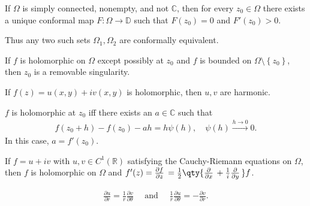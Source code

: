 \begin{theorem}

If \(\Omega\) is simply connected, nonempty, and not \({\mathbb{C}}\),
then for every \(z_{0}\in \Omega\) there exists a unique conformal map
\(F:\Omega \to {\mathbb{D}}\) such that \(F(z_{0}) = 0\) and
\(F'(z_{0}) > 0\).

Thus any two such sets \(\Omega_{1}, \Omega_{2}\) are conformally
equivalent.

\end{theorem}

\begin{theorem}

If \(f\) is holomorphic on \(\Omega\) except possibly at \(z_0\) and
\(f\) is bounded on \(\Omega\setminus\left\{{z_0}\right\}\), then
\(z_0\) is a removable singularity.

\end{theorem}

\begin{proposition}

If \(f(z) = u(x, y) + iv(x, y)\) is holomorphic, then \(u, v\) are
harmonic.

\end{proposition}

\begin{proposition}

\(f\) is holomorphic at \(z_0\) iff there exists an
\(a\in {\mathbb{C}}\) such that
\begin{align*}  
f(z_0 + h) - f(z_0) - ah = h \psi(h), \quad \psi(h) \overset{h\to 0}\to 0
.\end{align*}
In this case, \(a = f'(z_0)\).

\end{proposition}

\begin{proposition}

If \(f = u+iv\) with \(u, v\in C^1({\mathbb{R}})\) satisfying the
Cauchy-Riemann equations on \(\Omega\), then \(f\) is holomorphic on
\(\Omega\) and
\(f'(z) = {\frac{\partial f}{\partial z}\,} = {1 \over 2} \qty{{\frac{\partial }{\partial x}\,} + {1\over i} {\frac{\partial }{\partial y}\,}}f\).

\end{proposition}

\begin{proposition}

\begin{align*}  
\frac{\partial u}{\partial r}=\frac{1}{r} \frac{\partial v}{\partial \theta} \quad \text { and } \quad \frac{1}{r} \frac{\partial u}{\partial \theta}=-\frac{\partial v}{\partial r}
.\end{align*}

\end{proposition}

